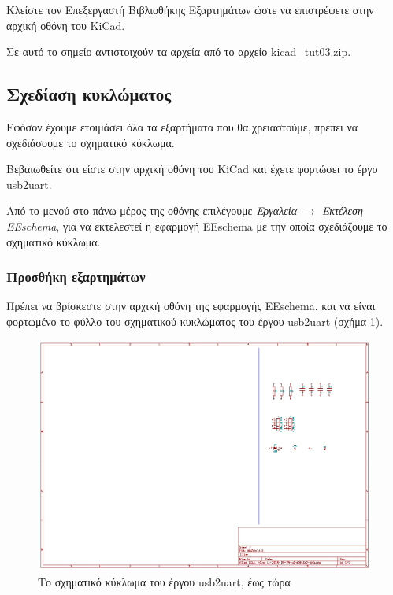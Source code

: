 \documentclass[a4paper]{article}
\begin{document}
Kλείστε τον Επεξεργαστή Βιβλιοθήκης Εξαρτημάτων ώστε να επιστρέψετε στην αρχική οθόνη του \textenglish{KiCad}.

Σε αυτό το σημείο αντιστοιχούν τα αρχεία από το αρχείο kicad\_tut03.zip.

\subsection{Σχεδίαση κυκλώματος}
Εφόσον έχουμε ετοιμάσει όλα τα εξαρτήματα που θα χρειαστούμε, πρέπει να σχεδιάσουμε το σχηματικό κύκλωμα. 

Βεβαιωθείτε ότι είστε στην αρχική οθόνη του \textenglish{KiCad} και έχετε φορτώσει το έργο usb2uart.

Από το μενού στο πάνω μέρος της οθόνης επιλέγουμε \textit{Εργαλεία $\rightarrow$ Εκτέλεση \textenglish{EEschema}}, για να εκτελεστεί η εφαρμογή \textenglish{EEschema} με την οποία σχεδιάζουμε το σχηματικό κύκλωμα. 

\subsubsection{Προσθήκη εξαρτημάτων}

Πρέπει να βρίσκεστε στην αρχική οθόνη της εφαρμογής \textenglish{EEschema}, και να είναι φορτωμένο το φύλλο του σχηματικού κυκλώματος του έργου usb2uart (σχήμα \ref{fig:eesch-circ-noic}).

\begin{figure}
  \begin{center}
    \includegraphics[width=.9\textwidth]{img/eesch-circ-noic.png}
    \caption{Το σχηματικό κύκλωμα του έργου usb2uart, έως τώρα}
    \label{fig:eesch-circ-noic}
  \end{center}
\end{figure}
\end{document}
